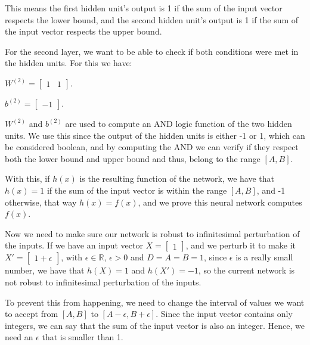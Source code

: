 \documentclass{article}
\begin{document}
This means the first hidden unit's output is 1 if the sum of the input vector respects the lower bound, 
and the second hidden unit's output is 1 if the sum of the input vector respects the upper bound.

For the second layer, we want to be able to check if both conditions were met in the hidden units. For this we have:

\bigskip

\( W^{(2)} = \begin{bmatrix}
    1 & 1
\end{bmatrix}
\).

\medskip

\(b^{(2)} = \begin{bmatrix}
    -1
\end{bmatrix}
\).

\bigskip

\(W^{(2)}\) and \(b^{(2)}\) are used to compute an AND logic function of the two hidden units. We use this since the output of
the hidden units is either -1 or 1, which can be considered boolean, and by computing the AND we can verify if they respect both the 
lower bound and upper bound and thus, belong to the range \([A, B]\). 

With this, if \(h(x)\) is the resulting function of the network, we have that \(h(x) = 1\) if the sum of the input vector is within the range \([A, B]\),
and -1 otherwise, that way \(h(x) = f(x)\), and we prove this neural network computes \(f(x)\).

\bigskip

Now we need to make sure our network is robust to infinitesimal perturbation of the inputs.
If we have an input vector $X = \begin{bmatrix}
    1
\end{bmatrix}
$, and we perturb it to make it $X' = \begin{bmatrix}
    1 + \epsilon
\end{bmatrix}
$, with $\epsilon \in \mathbb{R}$, $\epsilon > 0$ and $D = A = B = 1$, since $\epsilon$ is a really small number, 
we have that $h(X) = 1$ and $h(X') = -1$, so the current network is not robust to infinitesimal perturbation of the inputs.

\bigskip

To prevent this from happening, we need to change the interval of values we want to accept from $[A, B]$ to $[A - \epsilon, B + \epsilon]$.
Since the input vector contains only integers, we can say that
the sum of the input vector is also an integer. Hence, we need an $\epsilon$ that is smaller than 1. 
\end{document}
